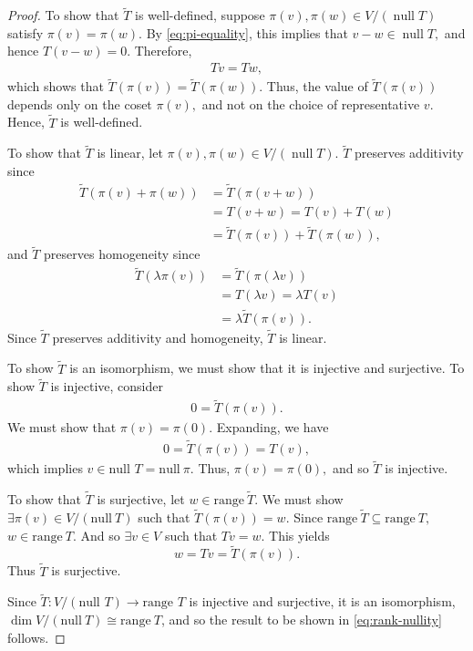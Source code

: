 \documentclass{article}
\numberwithin{equation}{section}
\begin{document}
\begin{proof}
To show that $\widetilde{T}$ is well-defined, suppose $\pi(v), \pi(w) \in V/(\operatorname{null}T)$ satisfy $\pi(v)=\pi(w)$. By \ref{eq:pi-equality}, this implies that $v-w\in \operatorname{null}T,$ and hence $T(v-w)=0.$ Therefore,
\begin{align*}
Tv = Tw,
\end{align*}
which shows that $\widetilde{T}(\pi(v))=\widetilde{T}(\pi(w)).$ Thus, the value of $\widetilde{T}(\pi(v))$ depends only on the coset $\pi(v),$ and not on the choice of representative $v.$ Hence, $\widetilde{T}$ is well-defined.

To show that $\widetilde{T}$ is linear, let $\pi(v),\pi(w) \in V/(\operatorname{null}T)$. $\widetilde{T}$ preserves additivity since
\begin{align*}
\widetilde{T}(\pi(v) + \pi(w)) &= \widetilde{T}(\pi(v + w)) \\
&= T(v + w) = T(v) + T(w) \\
&= \widetilde{T}(\pi(v)) + \widetilde{T}(\pi(w)),
\end{align*}
and $\widetilde{T}$ preserves homogeneity since
\begin{align*}
\widetilde{T}(\lambda\pi(v)) &= \widetilde{T}(\pi(\lambda v)) \\
&= T(\lambda v) = \lambda T(v) \\
&= \lambda \widetilde{T}(\pi(v)).
\end{align*}
Since $\widetilde{T}$ preserves additivity and homogeneity, $\widetilde{T}$ is linear.

To show $\widetilde{T}$ is an isomorphism, we must show that it is injective and surjective. To show $\widetilde{T}$ is injective, consider
\begin{align*}
0 = \widetilde{T}(\pi(v)).
\end{align*}
We must show that $\pi(v) = \pi(0).$ Expanding, we have
\begin{align*}
0 = \widetilde{T}(\pi(v)) = T(v),
\end{align*}
which implies $v \in \text{null }T = \mathrm{null}\ \pi.$ Thus, $\pi(v) = \pi(0),$ and so $\widetilde{T}$ is injective.

To show that $\widetilde{T}$ is surjective, let $w \in \mathrm{range }\ \widetilde{T}.$ We must show $\exists\pi(v) \in V/(\mathrm{null }\ T)$ such that $\widetilde{T}(\pi(v)) = w.$ Since $\mathrm{range}\ \widetilde{T} \subseteq \mathrm{range}\ T,$ $w \in \mathrm{range}\ T.$ And so $\exists v \in V$ such that $Tv = w$. This yields $$w = Tv = \widetilde{T}(\pi(v)).$$ Thus $\widetilde{T}$ is surjective.

Since $\widetilde{T}: V/(\text{null }T) \to \text{range }T$ is injective and surjective, it is an isomorphism, $\dim V/(\mathrm{null}\ T) \cong \mathrm{range}\ T$, and so the result to be shown in \ref{eq:rank-nullity} follows.

\end{proof}
\end{document}
